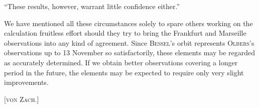 “These results, however, warrant little confidence either.”
\par\indent We have mentioned all these circumstances solely to spare others working on the calculation fruitless effort should they try to bring the Frankfurt and Marseille observations into any kind of agreement. Since \textsc{Bessel}’s orbit represents \textsc{Olbers}’s observations up to 13 November so satisfactorily, these elements may be regarded as accurately determined. If we obtain better observations covering a longer period in the future, the elements may be expected to require only very slight improvements.

\hfill[\textsc{von Zach.}]

